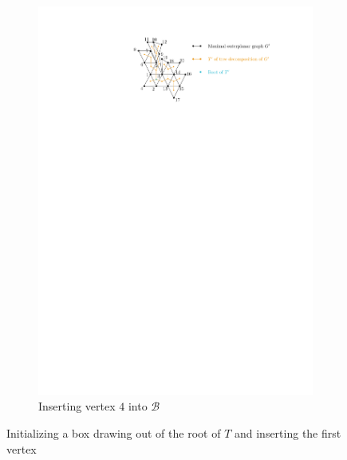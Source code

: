 \begin{figure}[H]
\begin{subfigure}{0.49\textwidth}
\includegraphics[page=3,width=\linewidth]{graphics/maximal_outerplanar_example_drawings.pdf}
\caption{Inserting vertex $4$ into $\mathcal{B}$}
\end{subfigure}

\caption{Initializing a box drawing out of the root of $T$ and inserting the first vertex}
\end{figure}
